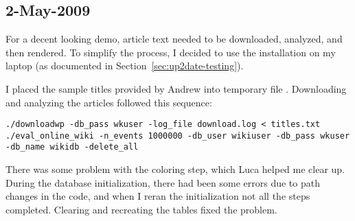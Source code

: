 \subsection{2-May-2009}

For a decent looking demo, article text needed to be downloaded,
analyzed, and then rendered.
To simplify the process, I decided to use the \mediawiki installation
on my laptop (as documented in Section~\ref{sec:up2date-testing}).

I placed the sample titles provided by Andrew into temporary
file .
Downloading and analyzing the articles followed this sequence:
\begin{verbatim}
./downloadwp -db_pass wkuser -log_file download.log < titles.txt 
./eval_online_wiki -n_events 1000000 -db_user wikiuser -db_pass wkuser -db_name wikidb -delete_all
\end{verbatim}

There was some problem with the coloring step, which Luca helped me clear up.
During the database initialization, there had been some errors due
to path changes in the code, and when I reran the initialization
not all the steps completed.
Clearing and recreating the \wikitrust tables fixed the problem.

